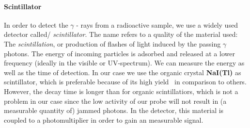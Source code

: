 \paragraph{Scintillator}
In order to detect the $\gamma$ - rays from a radioactive sample, we use a widely used detector called/
\emph{scintillator}. The name refers to a quality of the material used: The \emph{scintillation}, or production 
of flashes of light induced by the passing $\gamma$ photons. 
The energy of incoming particles
is adsorbed and released at a lower frequency (ideally in the visible or UV-spectrum). 
We can measure the energy as well as the time of detection. 
In our case we use the organic crystal \textbf{NaI(Tl)} as scintillator, which
is preferable because of its high yield~\cite{ver} in comparison to others. However, the decay time is longer
than for organic scintillatiors, which is not a problem in our case since the low activity of our probe will
not result in (a measurable quantity of) jammed photons.
In the detector, this material is coupled to a photomultiplier in order
to gain an measurable signal. 

